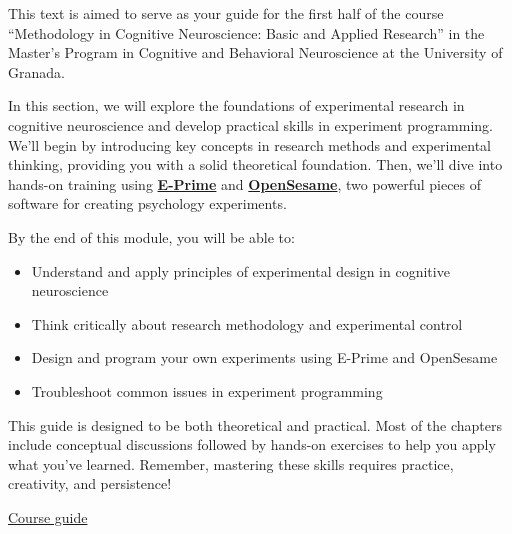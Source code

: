 \documentclass[
  letterpaper,
  DIV=11,
  numbers=noendperiod]{scrreprt}
\providecommand{\tightlist}{%
  \setlength{\itemsep}{0pt}\setlength{\parskip}{0pt}}\usepackage{longtable,booktabs,array}
\begin{document}
This text is aimed to serve as your guide for the first half of the
course ``Methodology in Cognitive Neuroscience: Basic and Applied
Research'' in the Master's Program in Cognitive and Behavioral
Neuroscience at the University of Granada.

In this section, we will explore the foundations of experimental
research in cognitive neuroscience and develop practical skills in
experiment programming. We'll begin by introducing key concepts in
research methods and experimental thinking, providing you with a solid
theoretical foundation. Then, we'll dive into hands-on training using
\href{https://pstnet.com/products/e-prime/}{\textbf{E-Prime}} and
\href{https://osdoc.cogsci.nl/}{\textbf{OpenSesame}}, two powerful
pieces of software for creating psychology experiments.

By the end of this module, you will be able to:

\begin{itemize}
\tightlist
\item
  Understand and apply principles of experimental design in cognitive
  neuroscience
\item
  Think critically about research methodology and experimental control
\item
  Design and program your own experiments using E-Prime and OpenSesame
\item
  Troubleshoot common issues in experiment programming
\end{itemize}

This guide is designed to be both theoretical and practical. Most of the
chapters include conceptual discussions followed by hands-on exercises
to help you apply what you've learned. Remember, mastering these skills
requires practice, creativity, and persistence!

\begin{tcolorbox}[enhanced jigsaw, opacitybacktitle=0.6, arc=.35mm, colbacktitle=quarto-callout-tip-color!10!white, bottomrule=.15mm, titlerule=0mm, coltitle=black, title=\textcolor{quarto-callout-tip-color}{\faLightbulb}\hspace{0.5em}{Relevant links}, toprule=.15mm, left=2mm, colback=white, rightrule=.15mm, bottomtitle=1mm, colframe=quarto-callout-tip-color-frame, opacityback=0, toptitle=1mm, breakable, leftrule=.75mm]

\href{https://masteres.ugr.es/neurocg/docencia/plan-estudios/guia-docente/M30/56/2/27}{Course
guide}

\end{tcolorbox}
\end{document}
